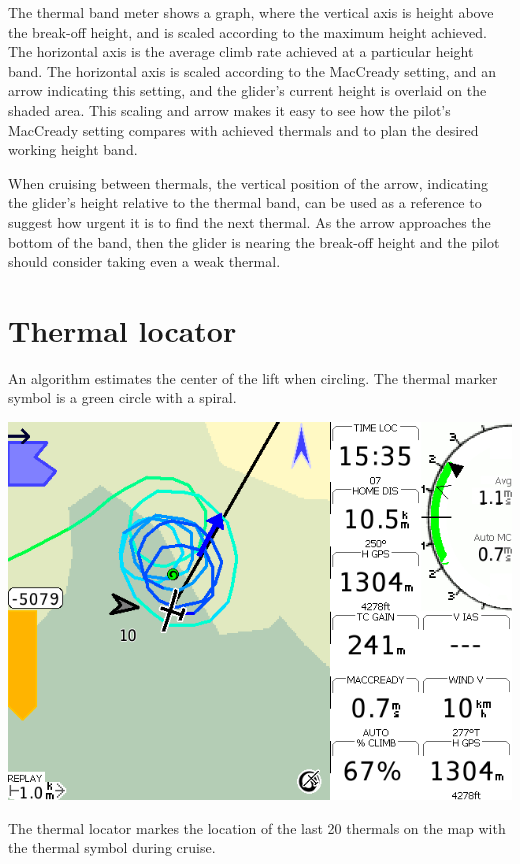 \documentclass[a4paper,12pt]{refrep}
\begin{document}
The thermal band meter shows a graph, where the vertical axis is
height above the break-off  height, and is scaled according to
the maximum height achieved.  The horizontal axis is the average climb
rate achieved at a particular height band.  The horizontal axis is
scaled according to the MacCready setting, and an arrow indicating this
setting, and the glider's current height is overlaid on the shaded
area.  This scaling and arrow makes it easy to see how the pilot's
MacCready setting compares with achieved thermals and to plan the
desired working height band.

When cruising between thermals, the vertical position of the arrow,
indicating the glider's height relative to the thermal band, can be
used as a reference to suggest how urgent it is to find the next
thermal.  As the arrow approaches the bottom of the band, then the
glider is nearing the break-off height and the pilot should consider
taking even a weak thermal.

\section{Thermal locator}
  An algorithm estimates the center of the lift when circling.  The
  thermal marker symbol is a green circle with a spiral.

\begin{center}
\includegraphics[angle=0,width=\linewidth,keepaspectratio='true']{figures/shot-tlocator-circling.png}
\end{center}

  The thermal locator markes the location of the last 20
  thermals on the map with the thermal symbol during cruise.
\end{document}

